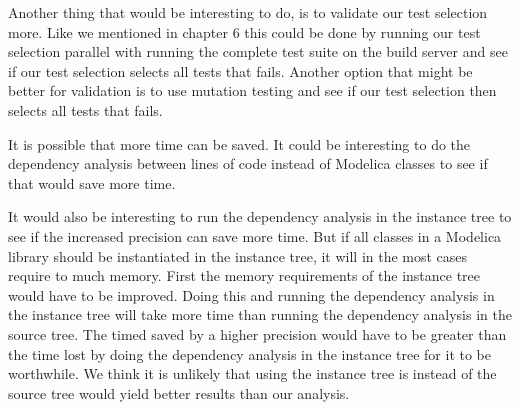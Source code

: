 \documentclass{cslthse-msc}
\begin{document}
Another thing that would be interesting to do, is to validate our test selection more. Like we mentioned in chapter 6 this could be done by running our test selection parallel with running the complete test suite on the build server and see if our test selection selects all tests that fails. Another option that might be better for validation is to use mutation testing and see if our test selection then selects all tests that fails.

It is possible that more time can be saved. It could be interesting to do the dependency analysis between lines of code instead of Modelica classes to see if that would save more time.

It would also be interesting to run the dependency analysis in the instance tree to see if the increased precision can save more time. But if all classes in a Modelica library should be instantiated in the instance tree, it will in the most cases require to much memory. First the memory requirements of the instance tree would have to be improved. Doing this and running the dependency analysis in the instance tree will take more time than running the dependency analysis in the source tree. The timed saved by a higher precision would have to be greater than the time lost by doing the dependency analysis in the instance tree for it to be worthwhile. We think it is unlikely that using the instance tree is instead of the source tree would yield better results than our analysis.

\printbibliography[heading=bibintoc]

\end{document}
